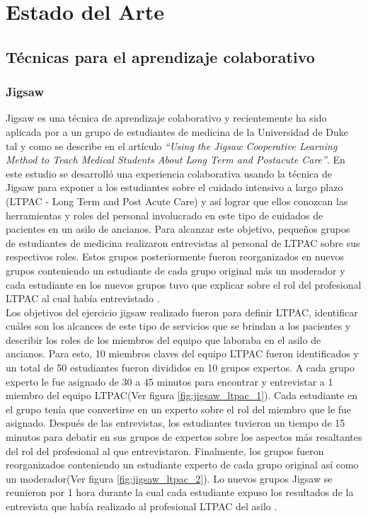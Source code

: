 \chapter{Estado del Arte}

\section{Técnicas para el aprendizaje colaborativo}

\subsection{Jigsaw}
Jigsaw es una técnica de aprendizaje colaborativo y recientemente ha sido aplicada por  a un grupo de estudiantes de medicina  de la Universidad de Duke tal y como se describe en el artículo \emph{``Using the Jigsaw Cooperative Learning Method to Teach Medical Students About Long Term and Postacute Care''}. En este estudio se desarrolló una experiencia colaborativa usando la técnica de Jigsaw para exponer a los estudiantes sobre el cuidado intensivo a largo plazo  (LTPAC - Long Term and Post Acute Care) y así lograr que ellos conozcan las herramientas y roles del personal involucrado en este tipo de cuidados de pacientes en un asilo de ancianos. Para alcanzar este objetivo, pequeños grupos de estudiantes de medicina realizaron entrevistas al personal de LTPAC sobre sus respectivos roles. Estos grupos posteriormente fueron reorganizados en nuevos grupos conteniendo un estudiante de cada grupo original más un moderador y cada estudiante en los nuevos grupos tuvo que explicar sobre el rol del profesional LTPAC al cual había entrevistado \cite{Buhr2014429}.\\

Los objetivos del ejercicio jigsaw realizado fueron para definir LTPAC, identificar cuáles son los alcances de este tipo de servicios que se brindan a los pacientes y describir los roles de los miembros del equipo que laboraba en el asilo de ancianos. Para esto, 10 miembros claves del equipo LTPAC fueron identificados y un total de 50 estudiantes fueron divididos en 10 grupos expertos. A cada grupo experto le fue asignado de 30 a 45 minutos para encontrar y entrevistar a 1 miembro del equipo LTPAC(Ver figura \ref{fig:jigsaw_ltpac_1}). Cada estudiante en el grupo tenía que convertirse en un experto sobre el rol del miembro que le fue asignado. Después de las entrevistas, los estudiantes tuvieron un tiempo de 15 minutos para debatir en sus grupos de expertos sobre los aspectos más resaltantes del rol del profesional al que entrevistaron. Finalmente, los grupos fueron reorganizados conteniendo un estudiante experto de cada grupo original así como un moderador(Ver figura \ref{fig:jigsaw_ltpac_2}). Lo nuevos grupos Jigsaw se reunieron por 1 hora durante la cual cada estudiante expuso los resultados de la entrevista que había realizado al profesional LTPAC del asilo \cite{Buhr2014429}.\\



